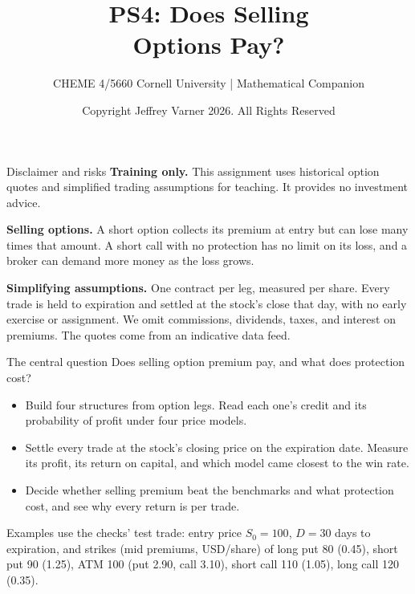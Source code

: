 \documentclass[aspectratio=169,11pt]{beamer}
\title{\texorpdfstring{{\vnheavy PS4}: Does Selling\\Options Pay?}{PS4: Does Selling Options Pay?}}
\subtitle{CHEME 4/5660 Cornell University | Mathematical Companion}
\author{Copyright Jeffrey Varner 2026. All Rights Reserved}
\begin{document}
\vntitlepage

\begin{frame}{Disclaimer and risks}
\textbf{Training only.} This assignment uses historical option quotes and
simplified trading assumptions for teaching. It provides no investment advice.

\vspace{1em}
\textbf{Selling options.} A short option collects its premium at entry but can
lose many times that amount. A short call with no protection has no limit on
its loss, and a broker can demand more money as the loss grows.

\vspace{1em}
\textbf{Simplifying assumptions.} One contract per leg, measured per share. Every
trade is held to expiration and settled at the stock's close that day, with no early
exercise or assignment. We omit commissions, dividends, taxes, and interest on
premiums. The quotes come from an indicative data feed.
\end{frame}

\begin{frame}{The central question}
Does selling option premium pay, and what does protection cost?
\vspace{0.2em}
\begin{itemize}\setlength{\itemsep}{0.15em}
\item {} Build four structures from option legs.
Read each one's credit and its probability of profit under four price models.
\item {} Settle every trade at the stock's closing
price on the expiration date. Measure its profit, its return on capital, and
which model came closest to the win rate.
\item {} Decide whether selling premium beat
the benchmarks and what protection cost, and see why every return is per trade.
\end{itemize}
Examples use the checks' test trade: entry price $S_0=100$, $D=30$ days to
expiration, and strikes (mid premiums, USD/share) of long put 80 (0.45), short
put 90 (1.25), ATM 100 (put 2.90, call 3.10), short call 110 (1.05), long call
120 (0.35).
\end{frame}
\end{document}
